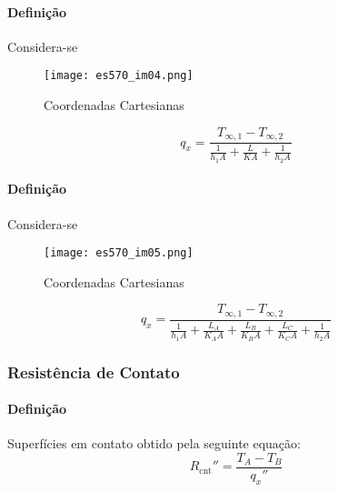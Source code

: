 \documentclass{article}
\begin{document}
            \paragraph{Definição}Considera-se
                \begin{figure}[H]
                    \centering
                    \texttt{[image: es570\_im04.png]}
                    \caption{Coordenadas Cartesianas}
                \end{figure} \noindent
                \begin{equation}
                    \boxed{
                            q_{x} = \frac{
                            T_{\infty,1} - T_{\infty,2}
                        }{
                            \frac{1}{h_{1}A} + 
                            \frac{L}{KA} + 
                            \frac{1}{h_{2}A}
                        }
                    }
                \end{equation}

            \paragraph{Definição}Considera-se
                \begin{figure}[H]
                    \centering
                    \texttt{[image: es570\_im05.png]}
                    \caption{Coordenadas Cartesianas}
                \end{figure} \noindent
                \begin{equation}
                    \boxed{
                            q_{x} = \frac{
                            T_{\infty,1} - T_{\infty,2}
                        }{
                            \frac{1}{h_{1}A} + 
                            \frac{L_{A}}{K_{A}A} + 
                            \frac{L_{B}}{K_{B}A} + 
                            \frac{L_{C}}{K_{C}A} + 
                            \frac{1}{h_{2}A}
                        }
                    }
                \end{equation}

        \subsubsection{Resistência de Contato}
            \paragraph{Definição}Superfícies em contato obtido pela seguinte equação:
                \begin{equation}
                    \boxed{
                        R_{\text{cnt}}'' = \frac{T_{A} - T_{B}}{q_{x}''}
                    }
                \end{equation}
\end{document}
